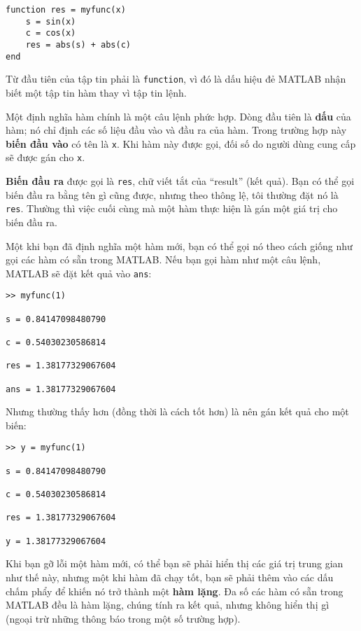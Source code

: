 \documentclass[12pt]{book}
\begin{document}
\begin{verbatim}
function res = myfunc(x)
    s = sin(x)
    c = cos(x)
    res = abs(s) + abs(c)
end
\end{verbatim}

Từ đầu tiên của tập tin phải là {\tt function}, vì đó là dấu hiệu đẻ
MATLAB nhận biết một tập tin hàm thay vì tập tin lệnh.

Một định nghĩa hàm chính là một câu lệnh phức hợp. Dòng đầu tiên là
{\bf dấu} của hàm; nó chỉ định các số liệu đầu vào và đầu ra của hàm. 
Trong trường hợp này {\bf biến đầu vào} có tên là {\tt x}. Khi hàm này
được gọi, đối số do người dùng cung cấp sẽ được gán cho {\tt x}.

{\bf Biến đầu ra} được gọi là {\tt res}, chữ viết tắt của ``result''
(kết quả). Bạn có thể gọi biến đầu ra bằng tên gì cũng được, nhưng
theo thông lệ, tôi thường đặt nó là {\tt res}.  Thường thì việc cuối
cùng mà một hàm thực hiện là gán một giá trị cho biến đầu ra.

Một khi bạn đã định nghĩa một hàm mới, bạn có thể gọi nó theo cách
giống như gọi các hàm có sẵn trong MATLAB. Nếu bạn gọi hàm như một
câu lệnh, MATLAB sẽ đặt kết quả vào {\tt ans}:

\begin{verbatim}
>> myfunc(1)

s = 0.84147098480790

c = 0.54030230586814

res = 1.38177329067604

ans = 1.38177329067604
\end{verbatim}

Nhưng thường thấy hơn (đồng thời là cách tốt hơn) là nên gán 
kết quả cho một biến:

\begin{verbatim}
>> y = myfunc(1)

s = 0.84147098480790

c = 0.54030230586814

res = 1.38177329067604

y = 1.38177329067604
\end{verbatim}

Khi bạn gỡ lỗi một hàm mới, có thể bạn sẽ phải hiển thị các
giá trị trung gian như thế này, nhưng một khi hàm đã chạy tốt, bạn
sẽ phải thêm vào các dấu chấm phẩy để khiến nó trở thành một 
{\bf hàm lặng}. Đa số các hàm có sẵn trong MATLAB đều là hàm lặng,
chúng tính ra kết quả, nhưng không hiển thị gì (ngoại trừ những
thông báo trong một số trường hợp).
\end{document}
